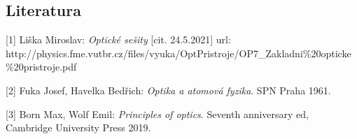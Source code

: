 \documentclass[
]{article}
\begin{document}
\hypertarget{literatura}{%
\subsection{\texorpdfstring{Literatura
}{Literatura }}\label{literatura}}

{[}1{]} Liška Miroslav: \emph{Optické sešity} {[}cit. 24.5.2021{]} url:
http://physics.fme.vutbr.cz/files/vyuka/OptPristroje/OP7\_Zakladni\%20opticke\%20pristroje.pdf

{[}2{]} Fuka Josef, Havelka Bedřich: \emph{Optika a atomová fyzika}. SPN
Praha 1961.

{[}3{]} Born Max, Wolf Emil: \emph{Principles of optics}. Seventh
anniversary ed, Cambridge University Press 2019.
\end{document}
